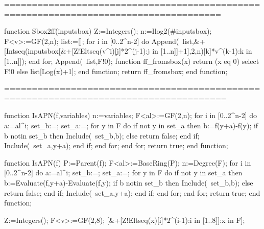 =====================================================================================



function Sbox2ff(inputsbox)
    Z:=Integers();
    n:=Ilog2(#inputsbox);
    F<v>:=GF(2,n);
    list:=[];
    for i in [0..2^n-2] do
        Append(~list,&+[Intseq(inputsbox[&+[Z!Eltseq(v^i)[j]*2^(j-1):j in [1..n]]+1],2,n)[k]*v^(k-1):k in [1..n]]);
    end for;
    Append(~list,F!0);
    function ff_fromsbox(x)
        return (x eq 0) select F!0 else list[Log(x)+1];
    end function;
    return ff_fromsbox;
end function;


======================================================================================

function IsAPN(f,variables)
    n:=variables;
    F<al>:=GF(2,n);
    for i in [0..2^n-2] do
        a:=al^i;
        set_b:={}; set_a:={};
        for y in F do
            if not y in set_a then
                b:=f(y+a)-f(y);
                if b notin set_b then
                    Include(~set_b,b);
                else
                    return false;
                end if;
                Include(~set_a,y+a);
            end if;
        end for;
    end for;
    return true;
end function;


function IsAPN(f)
    P:=Parent(f);
    F<al>:=BaseRing(P);
    n:=Degree(F);
    for i in [0..2^n-2] do
    a:=al^i;
    set_b:={}; set_a:={};
    for y in F do if not y in set_a then
    b:=Evaluate(f,y+a)-Evaluate(f,y);
    if b notin set_b then Include(~set_b,b);
    else
    return false; end if;
    Include(~set_a,y+a); end if;
    end for; end for;
    return true;
end function;


Z:=Integers();
F<v>:=GF(2,8);
[&+[Z!Eltseq(x)[i]*2^(i-1):i in [1..8]]:x in F]; 
